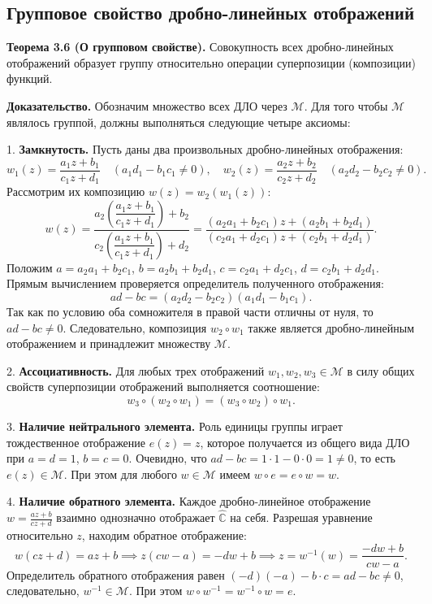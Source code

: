\documentclass[12pt, a4paper]{article}
\theoremstyle{definition}
\theoremstyle{remark}
\begin{document}
\vspace{1em}
\subsection{Групповое свойство дробно-линейных отображений}



\textbf{Теорема 3.6 (О групповом свойстве).} Совокупность всех дробно-линейных отображений образует группу относительно операции суперпозиции (композиции) функций.

\textbf{Доказательство.} Обозначим множество всех ДЛО через $\mathcal{M}$. Для того чтобы $\mathcal{M}$ являлось группой, должны выполняться следующие четыре аксиомы:

1. \textbf{Замкнутость.} Пусть даны два произвольных дробно-линейных отображения:
\[
w_1(z) = \frac{a_1 z + b_1}{c_1 z + d_1} \quad (a_1 d_1 - b_1 c_1 \neq 0), \quad w_2(z) = \frac{a_2 z + b_2}{c_2 z + d_2} \quad (a_2 d_2 - b_2 c_2 \neq 0).
\]
Рассмотрим их композицию $w(z) = w_2(w_1(z))$:
\[
w(z) = \frac{a_2 \left(\dfrac{a_1 z + b_1}{c_1 z + d_1}\right) + b_2}{c_2 \left(\dfrac{a_1 z + b_1}{c_1 z + d_1}\right) + d_2} = \frac{(a_2 a_1 + b_2 c_1)z + (a_2 b_1 + b_2 d_1)}{(c_2 a_1 + d_2 c_1)z + (c_2 b_1 + d_2 d_1)}.
\]
Положим $a = a_2 a_1 + b_2 c_1$, $b = a_2 b_1 + b_2 d_1$, $c = c_2 a_1 + d_2 c_1$, $d = c_2 b_1 + d_2 d_1$. Прямым вычислением проверяется определитель полученного отображения:
\[
ad - bc = (a_2 d_2 - b_2 c_2)(a_1 d_1 - b_1 c_1).
\]
Так как по условию оба сомножителя в правой части отличны от нуля, то $ad - bc \neq 0$. Следовательно, композиция $w_2 \circ w_1$ также является дробно-линейным отображением и принадлежит множеству $\mathcal{M}$.

2. \textbf{Ассоциативность.} Для любых трех отображений $w_1, w_2, w_3 \in \mathcal{M}$ в силу общих свойств суперпозиции отображений выполняется соотношение:
\[
w_3 \circ (w_2 \circ w_1) = (w_3 \circ w_2) \circ w_1.
\]

3. \textbf{Наличие нейтрального элемента.} Роль единицы группы играет тождественное отображение $e(z) = z$, которое получается из общего вида ДЛО при $a=d=1$, $b=c=0$. Очевидно, что $ad - bc = 1 \cdot 1 - 0 \cdot 0 = 1 \neq 0$, то есть $e(z) \in \mathcal{M}$. При этом для любого $w \in \mathcal{M}$ имеем $w \circ e = e \circ w = w$.

4. \textbf{Наличие обратного элемента.} Каждое дробно-линейное отображение $w = \frac{az + b}{cz + d}$ взаимно однозначно отображает $\hat{\mathbb{C}}$ на себя. Разрешая уравнение относительно $z$, находим обратное отображение:
\[
w(cz + d) = az + b \implies z(cw - a) = -dw + b \implies z = w^{-1}(w) = \frac{-dw + b}{cw - a}.
\]
Определитель обратного отображения равен $(-d)(-a) - b \cdot c = ad - bc \neq 0$, следовательно, $w^{-1} \in \mathcal{M}$. При этом $w \circ w^{-1} = w^{-1} \circ w = e$.
\end{document}
